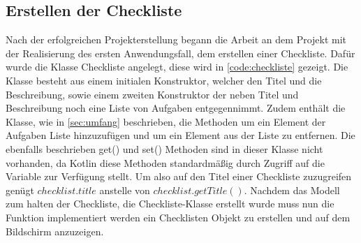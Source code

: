 \subsection{Erstellen der Checkliste}\label{subsec:erstelleChecklisten}

Nach der erfolgreichen Projekterstellung begann die Arbeit an dem Projekt mit der Realisierung des ersten Anwendungsfall, dem erstellen einer Checkliste. Dafür wurde die Klasse Checkliste angelegt, diese wird in \autoref{code:checkliste} gezeigt. Die Klasse besteht aus einem initialen Konstruktor, welcher den Titel und die Beschreibung, sowie einem zweiten Konstruktor der neben Titel und Beschreibung noch eine Liste von Aufgaben entgegennimmt. Zudem enthält die Klasse, wie in \autoref{sec:umfang} beschrieben, die Methoden um ein Element der Aufgaben Liste hinzuzufügen und um ein Element aus der Liste zu entfernen. Die ebenfalls beschrieben get() und set() Methoden sind in dieser Klasse nicht vorhanden, da Kotlin diese Methoden standardmäßig durch Zugriff auf die Variable zur Verfügung stellt. Um also auf den Titel einer Checkliste zuzugreifen genügt $checklist.title$ anstelle von $checklist.getTitle()$. Nachdem das Modell zum halten der Checkliste, die Checkliste-Klasse erstellt wurde muss nun die Funktion implementiert werden ein Checklisten Objekt zu erstellen und auf dem Bildschirm anzuzeigen.
\\


